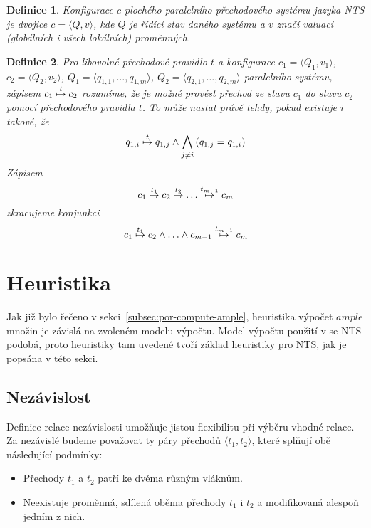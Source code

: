 \documentclass[12pt]{fithesis2}
\newtheorem{definition}{Definice}
\newcommand{\tuple}[1]{\langle #1 \rangle}
\begin{document}
\begin{definition}
\textit{Konfigurace} $c$ plochého paralelního přechodového systému jazyka NTS je dvojice $c = \tuple{Q, v}$, kde $Q$ je řídící stav daného systému a $v$ značí valuaci (globálních i všech lokálních) proměnných.
\end{definition}

\begin{definition}
Pro libovolné přechodové pravidlo $t$ a konfigurace $c_1 = \tuple{Q_1, v_1}$, $c_2=\tuple{Q_2, v_2}$, $Q_1 = \tuple{q_{1,1}, \ldots, q_{1, m}}$, $Q_2 = \tuple{q_{2,1}, \ldots, q_{2, m}}$ paralelního systému, zápisem $c_1 \overset{t}{\mapsto} c_2$ rozumíme, že je možné provést přechod ze stavu $c_1$ do stavu $c_2$ pomocí přechodového pravidla $t$. To může nastat právě tehdy, pokud existuje $i$ takové, že
\begin{equation}
q_{1,i} \overset{t}{\mapsto} q_{1,j} \land \bigwedge_{j \neq i}\left({q_{1,j} = q_{1,i}}\right)
\end{equation}
Zápisem
\begin{equation*}
c_1 \overset{t_1}{\mapsto} c_2 \overset{t_2}{\mapsto} \ldots \overset{t_{m-1}}{\mapsto} c_m
\end{equation*}
zkracujeme konjunkci
\begin{equation*}
c_1 \overset{t_1}{\mapsto} c_2 \land \ldots \land c_{m-1} \overset{t_{m-1}}{\mapsto} c_m
\end{equation*}
\end{definition}


\section{Heuristika}
Jak již bylo řečeno v sekci~\ref{subsec:por-compute-ample}, heuristika výpočet $\mathit{ample}$ množin je závislá na zvoleném modelu výpočtu. Model výpočtu použití v \cite{CLARKE} se NTS podobá, proto heuristiky tam uvedené tvoří základ heuristiky pro NTS, jak je popsána v této sekci.

\subsection{Nezávislost}
Definice relace nezávislosti umožňuje jistou flexibilitu při výběru vhodné relace. Za nezávislé budeme považovat ty páry přechodů $\tuple{t_1, t_2}$, které splňují obě následující podmínky:
\begin{itemize}
\item Přechody $t_1$ a $t_2$ patří ke dvěma různým vláknům.
\item Neexistuje proměnná, sdílená oběma přechody $t_1$ i $t_2$ a modifikovaná alespoň jedním z nich.
\end{itemize}
\end{document}
